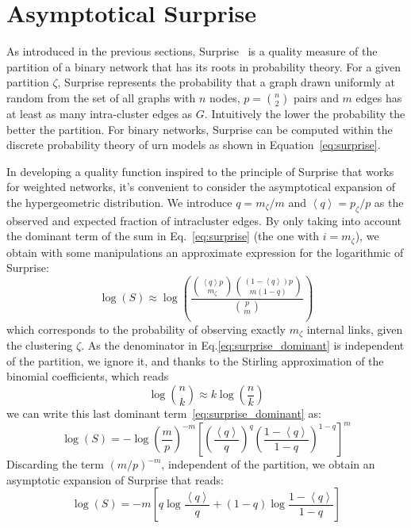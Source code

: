 \section{Asymptotical Surprise}
As introduced in the previous sections, Surprise~\cite{aldecoa2011,aldecoa2013} is a quality measure of the partition of a binary network that has its roots in probability theory.
For a given partition $\zeta$, Surprise represents the probability that a graph drawn uniformly at random from the set of all graphs with $n$ nodes, $p=\binom{n}{2}$ pairs and $m$ edges has at least as many intra-cluster edges as $G$. Intuitively the lower the probability the better the partition.  For binary networks, Surprise can be computed within the discrete probability theory of urn models as shown in Equation~\ref{eq:surprise}.

In developing a quality function inspired to the principle of Surprise that works for weighted networks, it's convenient to consider the asymptotical expansion of the hypergeometric distribution. We introduce  $q=m_\zeta/m$ and $\left<q \right>=p_\zeta/p$ as the observed and expected fraction of intracluster edges. By only taking into account the dominant term of the sum in Eq.~\ref{eq:surprise} (the one with $i=m_\zeta$), we obtain with some manipulations an approximate expression for the logarithmic of Surprise:
\begin{equation}\label{eq:surprise_dominant}
\log(S) \approx \log \left( \frac{\binom{\left<q\right> p}{m_\zeta} \binom{(1-\left<q\right>)p}{m(1-q)}}{\binom{p}{m}} \right)
\end{equation}
which corresponds to the probability of observing exactly $m_\zeta$ internal links, given the clustering $\zeta$. As the denominator in Eq.\ref{eq:surprise_dominant} is independent of the partition, we ignore it, and thanks to the Stirling approximation of the binomial coefficients, which reads 
\begin{equation}
\log \binom{n}{k} \approx k \log \left( \frac{n}{k} \right)
\end{equation}
we can write this last dominant term~\ref{eq:surprise_dominant} as:
\begin{equation}
\log(S) = - \log \left(\frac{m}{p}\right)^{-m} \left[ \left(\frac{\left< q\right>}{q}\right)^q \left(\frac{1-\left< q\right>}{1-q}\right)^{1-q} \right]^{m}
\end{equation}
Discarding the term $(m/p)^{-m}$, independent of the partition, we obtain an asymptotic expansion of Surprise that reads:
\begin{equation}
\log(S) = -m \left[ q \log \frac{\left<q\right>}{q} + (1-q)\log \frac{1-\left<q\right>}{1-q} \right]
\end{equation}

